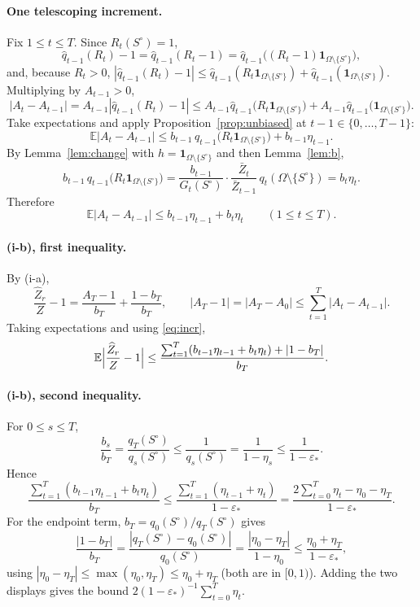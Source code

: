 \documentclass[11pt]{article}
\theoremstyle{remark}
\newcommand{\E}{\mathbb{E}}
\newcommand{\Om}{\Omega}
\newcommand{\qh}{\widehat q}
\newcommand{\Zh}{\widehat Z}
\newcommand{\Zb}{\bar Z}
\newcommand{\So}{S^{\circ}}
\begin{document}
\paragraph{One telescoping increment.} Fix $1\le t\le T$. Since $R_t(\So)=1$,
\[
\qh_{t-1}(R_t)-1=\qh_{t-1}(R_t-1)=\qh_{t-1}\bigl((R_t-1)\mathbf 1_{\Om\setminus\{\So\}}\bigr),
\]
and, because $R_t>0$,
$|\qh_{t-1}(R_t)-1|\le\qh_{t-1}(R_t\mathbf 1_{\Om\setminus\{\So\}})+\qh_{t-1}(\mathbf 1_{\Om\setminus\{\So\}})$.
Multiplying by $A_{t-1}>0$,
\[
|A_t-A_{t-1}|=A_{t-1}|\qh_{t-1}(R_t)-1|
\le A_{t-1}\qh_{t-1}\bigl(R_t\mathbf 1_{\Om\setminus\{\So\}}\bigr)+A_{t-1}\qh_{t-1}\bigl(\mathbf 1_{\Om\setminus\{\So\}}\bigr).
\]
Take expectations and apply Proposition~\ref{prop:unbiased} at $t-1\in\{0,\dots,T-1\}$:
\[
\E|A_t-A_{t-1}|\le b_{t-1}\,q_{t-1}\bigl(R_t\mathbf 1_{\Om\setminus\{\So\}}\bigr)+b_{t-1}\eta_{t-1}.
\]
By Lemma~\ref{lem:change} with $h=\mathbf 1_{\Om\setminus\{\So\}}$ and then Lemma~\ref{lem:b},
\[
b_{t-1}\,q_{t-1}\bigl(R_t\mathbf 1_{\Om\setminus\{\So\}}\bigr)
=\frac{b_{t-1}}{G_t(\So)}\cdot\frac{\Zb_t}{\Zb_{t-1}}\,q_t(\Om\setminus\{\So\})=b_t\eta_t .
\]
Therefore
\begin{equation}\label{eq:incr}
\E|A_t-A_{t-1}|\le b_{t-1}\eta_{t-1}+b_t\eta_t\qquad(1\le t\le T).
\end{equation}

\paragraph{(i-b), first inequality.} By (i-a),
\[
\frac{\Zh_r}{Z}-1=\frac{A_T-1}{b_T}+\frac{1-b_T}{b_T},
\qquad |A_T-1|=|A_T-A_0|\le\sum_{t=1}^T|A_t-A_{t-1}| .
\]
Taking expectations and using \eqref{eq:incr},
\[
\E\Bigl|\frac{\Zh_r}{Z}-1\Bigr|\le\frac{\sum_{t=1}^T(b_{t-1}\eta_{t-1}+b_t\eta_t)+|1-b_T|}{b_T}.
\]

\paragraph{(i-b), second inequality.} For $0\le s\le T$,
\[
\frac{b_s}{b_T}=\frac{q_T(\So)}{q_s(\So)}\le\frac1{q_s(\So)}=\frac1{1-\eta_s}\le\frac1{1-\varepsilon_*}.
\]
Hence
\[
\frac{\sum_{t=1}^T(b_{t-1}\eta_{t-1}+b_t\eta_t)}{b_T}\le\frac{\sum_{t=1}^T(\eta_{t-1}+\eta_t)}{1-\varepsilon_*}
=\frac{2\sum_{t=0}^T\eta_t-\eta_0-\eta_T}{1-\varepsilon_*}.
\]
For the endpoint term, $b_T=q_0(\So)/q_T(\So)$ gives
\[
\frac{|1-b_T|}{b_T}=\frac{|q_T(\So)-q_0(\So)|}{q_0(\So)}=\frac{|\eta_0-\eta_T|}{1-\eta_0}
\le\frac{\eta_0+\eta_T}{1-\varepsilon_*},
\]
using $|\eta_0-\eta_T|\le\max(\eta_0,\eta_T)\le\eta_0+\eta_T$ (both are in $[0,1)$). Adding the two displays gives the
bound $2(1-\varepsilon_*)^{-1}\sum_{t=0}^T\eta_t$.
\end{document}

